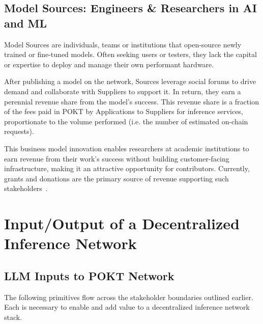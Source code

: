 \documentclass[conference,compsoc]{IEEEtran}
\begin{document}
\subsection{Model Sources: Engineers \& Researchers in AI and ML}
Model Sources are individuals, teams or institutions that open-source newly trained or fine-tuned models. Often seeking users or testers, they lack the capital or expertise to deploy and manage their own performant hardware.

After publishing a model on the network, Sources leverage social forums to drive demand and collaborate with Suppliers to support it. In return, they earn a perennial revenue share from the model's success. This revenue share is a fraction of the fees paid in POKT by Applications to Suppliers for inference services, proportionate to the volume performed (i.e. the number of estimated on-chain requests).

This business model innovation enables researchers at academic institutions to earn revenue from their work's success without building customer-facing infrastructure, making it an attractive opportunity for contributors. Currently, grants and donations are the primary source of revenue supporting such stakeholders~\cite{lmsysDonationsLMSYS}.





\section{Input/Output of a Decentralized Inference Network}

\subsection{LLM Inputs to POKT Network}
The following primitives flow across the stakeholder boundaries outlined earlier. Each is necessary to enable and add value to a decentralized inference network stack.
\end{document}
